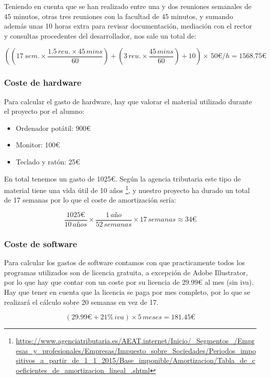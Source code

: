 Teniendo en cuenta que se han realizado entre una y dos reuniones semanales de 45 minutos, otras tres reuniones con la facultad de 45 minutos, y sumando además unas 10 horas extra para revisar documentación, mediación con el rector y consultas procedentes del desarrollador, nos sale un total de:

\[ \left (  \left ( 17\: sem. \times \frac{1.5\, reu.\times 45\, mins}{60} \right )+\left ( 3\, reu. \times \frac{45\, mins}{60} \right ) + 10\right )\times\, 50\euro/h = 1568.75\euro \]


\subsubsection{Coste de hardware}

Para calcular el gasto de hardware, hay que valorar el material utilizado durante el proyecto por el alumno:
\begin{itemize}
	\item Ordenador potátil: 900€
	\item Monitor: 100€
	\item Teclado y ratón: 25€
\end{itemize}

En total tenemos un gasto de 1025€. Según la agencia tributaria este tipo de material tiene una vida útil de 10 años \footnote{\url{https://www.agenciatributaria.es/AEAT.internet/Inicio/_Segmentos_/Empresas_y_profesionales/Empresas/Impuesto_sobre_Sociedades/Periodos_impositivos_a_partir_de_1_1_2015/Base_imponible/Amortizacion/Tabla_de_coeficientes_de_amortizacion_lineal_.shtml}}, y nuestro proyecto ha durado un total de 17 semanas por lo que el coste de amortización sería:

\[\frac{1025\euro}{10\, a\textit{ñ}os} \times \frac{1\, a\textit{ñ}o}{52\, semanas} \times 17\, semanas \approx  34\euro \]

\subsubsection{Coste de software}

Para calcular los gastos de software contamos con que practicamente todos los programas utilizados son de licencia gratuita, a excepción de Adobe Illustrator, por lo que hay que contar con un coste por su licencia de 29.99€ al mes (sin iva). Hay que tener en cuenta que la licencia se paga por mes completo, por lo que se realizará el cálculo sobre 20 semanas en vez de 17.

\[ (29.99 \euro + 21\% \, iva) \times 5\, meses = 181.45 \euro\]

